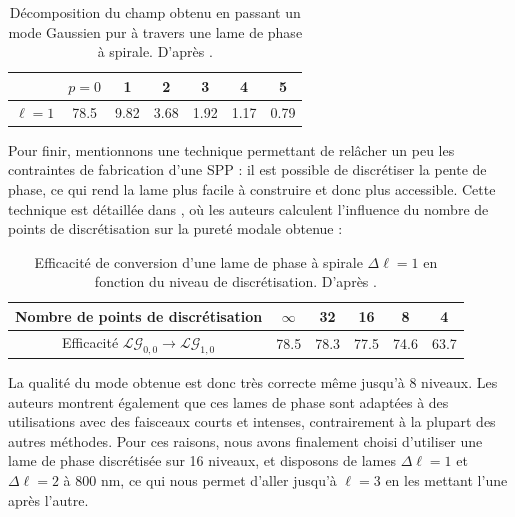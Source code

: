 \newpage
\begin{table}[!ht]
\begin{center}
  \begin{tabular}{| c | c | c | c | c | c | c |}
    \hline
		& $p = 0$ & 1 & 2 & 3 & 4 & 5 \\ \hline
    $\ell=1$ & 78.5 & 9.82 & 3.68 & 1.92 & 1.17 & 0.79 \\ \hline
  \end{tabular}
	\caption{Décomposition du champ obtenu en passant un mode Gaussien pur à travers une lame de phase à spirale. D'après .}
	\label{Tab:DecompBei}
\end{center}
\end{table}
Pour finir, mentionnons une technique permettant de relâcher un peu les contraintes de fabrication d'une SPP : il est possible de discrétiser la pente de phase, ce qui rend la lame plus facile à construire et donc plus accessible. Cette technique est détaillée dans , où les auteurs calculent l'influence du nombre de points de discrétisation sur la pureté modale obtenue :
\begin{table}[!ht]
\begin{center}
  \begin{tabular}{| c | c | c | c | c | c |}
    \hline
		Nombre de points de discrétisation & $\infty$ & 32 & 16 & 8 & 4 \\ \hline
    Efficacité $\mathcal{LG}_{0,0}\rightarrow\mathcal{LG}_{1,0}$ & 78.5 & 78.3 & 77.5 & 74.6 & 63.7 \\ \hline
  \end{tabular}
	\caption{Efficacité de conversion d'une lame de phase à spirale $\Delta\ell=1$ en fonction du niveau de discrétisation. D'après .}
	\label{Tab:DecompSueda}
\end{center}
\end{table}
La qualité du mode obtenue est donc très correcte même jusqu'à 8 niveaux. Les auteurs montrent également que ces lames de phase sont adaptées à des utilisations avec des faisceaux courts et intenses, contrairement à la plupart des autres méthodes. Pour ces raisons, nous avons finalement choisi d'utiliser une lame de phase discrétisée sur 16 niveaux, et disposons de lames $\Delta\ell = 1$ et $\Delta\ell = 2$ à 800 nm, ce qui nous permet d'aller jusqu’à $\ell = 3$ en les mettant l'une après l'autre.

